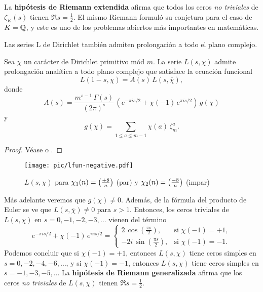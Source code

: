 La \textbf{hipótesis de Riemann extendida} afirma que todos los ceros
\emph{no triviales} de $\zeta_K (s)$ tienen $\Re s = \frac{1}{2}$. El mismo
Riemann formuló su conjetura para el caso de $K = \mathbb{Q}$, y este es uno de los
problemas abiertos más importantes en matemáticas.

\vspace{1em}

Las series L de Dirichlet también admiten prolongación a todo el plano complejo.

\begin{teorema}
  Sea $\chi$ un carácter de Dirichlet primitivo mód $m$. La serie $L (s,\chi)$
  admite prolongación analítica a todo plano complejo que satisface la ecuación
  funcional
  \begin{equation}
    \label{eqn:ecuacion-funcional-para-series-L}
    L (1-s,\chi) = A(s) \, L (s,\overline{\chi}),
  \end{equation}
  donde
  $$A (s) = \frac{m^{s-1}\,\Gamma (s)}{(2\pi)^s} \, \left(e^{-\pi i s/2} + \chi (-1)\,e^{\pi i s/2}\right)\,g (\chi)$$
  y
  $$g (\chi) = \sum_{1 \le a \le m-1} \chi (a) \, \zeta_m^a.$$

  \begin{proof}
    Véase \cite[\S VII.2]{Neukirch-ANT} o \cite[Chapter~12]{Apostol-analytic}.
  \end{proof}
\end{teorema}

\begin{figure}
  \begin{center}
    \texttt{[image: pic/lfun-negative.pdf]}
  \end{center}

  \caption{$L (s,\chi)$ para $\chi_1 (n) = \left(\frac{+8}{n}\right)$ (par) y $\chi_2 (n) = \left(\frac{-8}{n}\right)$ (impar)}
\end{figure}

Más adelante veremos que $g (\chi) \ne 0$. Además, de la fórmula del producto de
Euler se ve que $L (s,\overline{\chi}) \ne 0$ para $s > 1$. Entonces, los ceros
triviales de $L (s,\chi)$ en $s = 0,-1,-2,-3,\ldots$ vienen del término
\[ e^{-\pi i s/2} + \chi (-1)\,e^{\pi i s/2} = \begin{cases}
  2 \, \cos \left(\frac{\pi s}{2}\right), & \text{si }\chi (-1) = +1,\\
  -2i \, \sin \left(\frac{\pi s}{2}\right), & \text{si }\chi (-1) = -1.
\end{cases} \]
Podemos concluir que si $\chi (-1) = +1$, entonces $L (s,\chi)$ tiene ceros
simples en $s = 0, -2, -4, -6, \ldots$, y si $\chi (-1) = -1$, entonces
$L (s,\chi)$ tiene ceros simples en $s = -1, -3, -5, \ldots$
La \textbf{hipótesis de Riemann generalizada} afirma que los ceros
\emph{no triviales} de $L (s,\chi)$ tienen $\Re s = \frac{1}{2}$.

